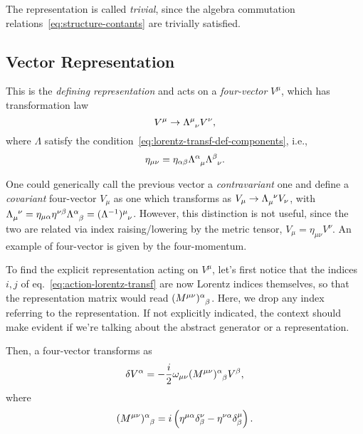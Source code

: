 The representation is called \emph{trivial}, since the algebra commutation relations~\eqref{eq:structure-contants} are trivially satisfied.

\subsection{Vector Representation}\label{sec:vector-representation}
This is the \emph{defining representation} and acts on a \emph{four-vector} $V^\mu$, which has transformation law
\begin{equation}\label{eq:lorentz-transf-four-vector}
    V^\mu \to \tensor{\Lambda}{^\mu_\nu} V^\nu,
\end{equation}
where $\Lambda$ satisfy the condition~\eqref{eq:lorentz-transf-def-components}, i.e.,
\begin{equation*}
    \eta_{\mu\nu} = \eta_{\alpha\beta} \tensor{\Lambda}{^\alpha_\mu} \tensor{\Lambda}{^\beta_\nu}.
\end{equation*}

One could generically call the previous vector a \emph{contravariant} one and define a \emph{covariant} four-vector $V_\mu$ as one which transforms as $V_\mu \to \tensor{\Lambda}{_\mu^\nu} V_\nu$, with $\tensor{\Lambda}{_\mu^\nu} = \eta_{\mu\alpha} \eta^{\nu\beta} \tensor{\Lambda}{^\alpha_\beta} = \tensor{(\Lambda^{-1})}{^\mu_\nu}$. However, this distinction is not useful, since the two are related via index raising/lowering by the metric tensor, $V_\mu = \eta_{\mu\nu} V^\nu$. An example of four-vector is given by the four-momentum.

To find the explicit representation acting on $V^\mu$, let's first notice that the indices $i,j$ of eq.~\eqref{eq:action-lorentz-transf} are now Lorentz indices themselves, so that the representation matrix would read $\tensor{(M^{\mu\nu})}{^\alpha_\beta}$. Here, we drop any index referring to the representation. If not explicitly indicated, the context should make evident if we're talking about the abstract generator or a representation. 

Then, a four-vector transforms as
\begin{equation}\label{eq:variation-lorentz-transf-four-vector}
   \delta V^\alpha = - \frac{i}{2} \omega_{\mu\nu} \tensor{(M^{\mu\nu})}{^\alpha_\beta} V^\beta ,
\end{equation}
where
\begin{equation}\label{eq:lorentz-transf-matrix-vector-rep}
    \tensor{(M^{\mu\nu})}{^\alpha_\beta} = i \left( \eta^{\mu\alpha} \delta^\nu_\beta - \eta^{\nu\alpha} \delta^\mu_\beta \right) .
\end{equation}

